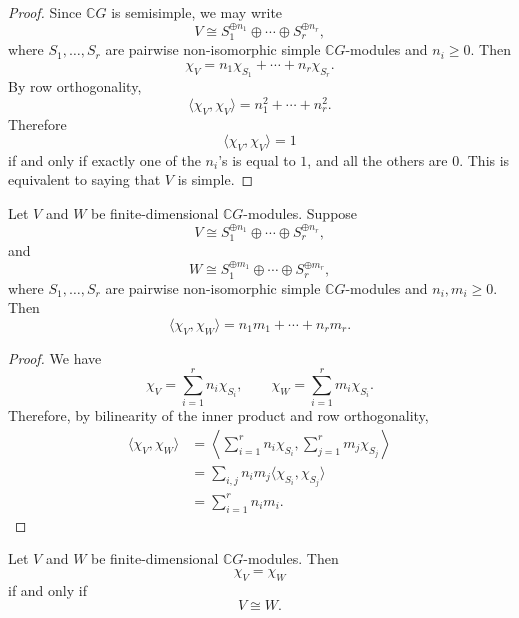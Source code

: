 \begin{proof}
    Since \(\mathbb{C}G\) is semisimple, we may write
    \[
        V
        \cong
        S_1^{\oplus n_1}
        \oplus
        \cdots
        \oplus
        S_r^{\oplus n_r},
    \]
    where \(S_1,\dots,S_r\) are pairwise non-isomorphic simple
    \(\mathbb{C}G\)-modules and \(n_i\geq 0\). Then
    \[
        \chi_V
        =
        n_1\chi_{S_1}
        +
        \cdots
        +
        n_r\chi_{S_r}.
    \]
    By row orthogonality,
    \[
        \langle \chi_V,\chi_V\rangle
        =
        n_1^2+\cdots+n_r^2.
    \]
    Therefore
    \[
        \langle \chi_V,\chi_V\rangle=1
    \]
    if and only if exactly one of the \(n_i\)'s is equal to \(1\), and all the
    others are \(0\). This is equivalent to saying that \(V\) is simple.
\end{proof}

\begin{lemma}
    Let \(V\) and \(W\) be finite-dimensional \(\mathbb{C}G\)-modules. Suppose
    \[
        V
        \cong
        S_1^{\oplus n_1}
        \oplus
        \cdots
        \oplus
        S_r^{\oplus n_r},
    \]
    and
    \[
        W
        \cong
        S_1^{\oplus m_1}
        \oplus
        \cdots
        \oplus
        S_r^{\oplus m_r},
    \]
    where \(S_1,\dots,S_r\) are pairwise non-isomorphic simple
    \(\mathbb{C}G\)-modules and \(n_i,m_i\geq 0\). Then
    \[
        \langle \chi_V,\chi_W\rangle
        =
        n_1m_1+\cdots+n_rm_r.
    \]
\end{lemma}

\begin{proof}
    We have
    \[
        \chi_V
        =
        \sum_{i=1}^r n_i\chi_{S_i},
        \qquad
        \chi_W
        =
        \sum_{i=1}^r m_i\chi_{S_i}.
    \]
    Therefore, by bilinearity of the inner product and row orthogonality,
    \[
        \begin{aligned}
            \langle \chi_V,\chi_W\rangle
             & =
            \left\langle
            \sum_{i=1}^r n_i\chi_{S_i},
            \sum_{j=1}^r m_j\chi_{S_j}
            \right\rangle                        \\
             & =
            \sum_{i,j}n_i m_j
            \langle \chi_{S_i},\chi_{S_j}\rangle \\
             & =
            \sum_{i=1}^r n_i m_i.
        \end{aligned}
    \]
\end{proof}

\begin{corollary}
    Let \(V\) and \(W\) be finite-dimensional \(\mathbb{C}G\)-modules. Then
    \[
        \chi_V=\chi_W
    \]
    if and only if
    \[
        V\cong W.
    \]
\end{corollary}

